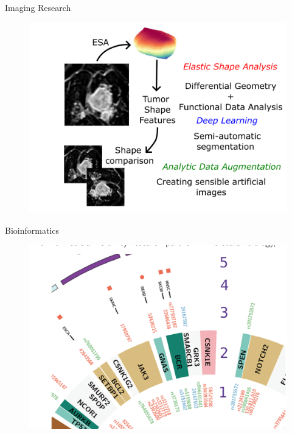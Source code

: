 \documentclass[11pt, aspectratio=43]{beamer}
\begin{document}
\begin{frame}{Imaging Research}
	
	\begin{figure}[h]
		\centering
		\includegraphics{Figures/hgresearch.png}
	\end{figure}
	
\end{frame}
	\begin{frame}{Bioinformatics }
		
		\begin{figure}[h]
			\centering
			\includegraphics[scale=0.45]{Figures/analyz.png}
		\end{figure}
		
		
	\end{frame}
	
\end{document}
